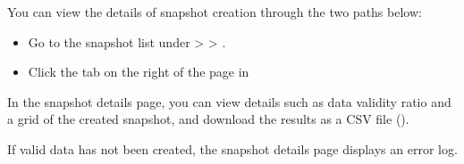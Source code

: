 \documentclass[letterpaper,10pt,english]{sphinxmanual}
\begin{document}
You can view the details of snapshot creation through the two paths below:
\begin{itemize}
\item {} 
Go to the snapshot list under  \textgreater{}  \textgreater{} .
\begin{quote}

\begin{figure}[H]
\centering

\noindent{}
\end{figure}
\end{quote}

\item {} 
Click the  tab on the right of the {\hyperref[\detokenize{discovery/part07/edit_rules::doc}]{}} page in 
\begin{quote}

\begin{figure}[H]
\centering

\noindent{}
\end{figure}
\end{quote}

\end{itemize}

In the snapshot details page, you can view details such as data validity ratio and a grid of the created snapshot, and download the results as a CSV file ({\hyperref[\detokenize{discovery/part07/data_snapshot:snapshot-into-csv}]{}}).
\begin{quote}

\begin{figure}[H]
\centering

\noindent{}
\end{figure}
\end{quote}

If valid data has not been created, the snapshot details page displays an error log.
\begin{quote}

\begin{figure}[H]
\centering

\noindent{}
\end{figure}
\end{quote}
\end{document}
